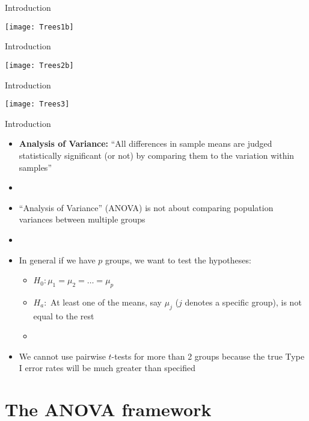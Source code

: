\documentclass[xcolor=dvipsnames]{beamer}
\begin{document}
\begin{frame}{Introduction}
	\begin{center}
		\texttt{[image: Trees1b]}
	\end{center}
\end{frame}

\begin{frame}{Introduction}
	\begin{center}
		\texttt{[image: Trees2b]}
	\end{center}
\end{frame}

\begin{frame}{Introduction}
	\begin{center}
		\texttt{[image: Trees3]}
	\end{center}
\end{frame}

\begin{frame}{Introduction}
	\begin{itemize}
		\item \textbf{Analysis of Variance:} ``All differences in sample means are judged statistically
		significant (or not) by comparing them to the variation within samples''
		\item[]
		\item ``Analysis of Variance'' (ANOVA) is not about comparing population variances between multiple groups
		\item[]
		\item In general if we have $p$ groups, we want to test the hypotheses:
		\begin{itemize}
			\item $H_0: \mu_1 = \mu_2 = \hdots = \mu_p$
			\item $H_a: $ At least one of the means, say $\mu_j$ ($j$ denotes a specific group), is not equal to the rest 
			\item[]
		\end{itemize}
		\item We cannot use pairwise $t$-tests for more than 2 groups because the true Type I error rates will be much greater than specified
	\end{itemize}
\end{frame}

\section{The ANOVA framework}
\end{document}
